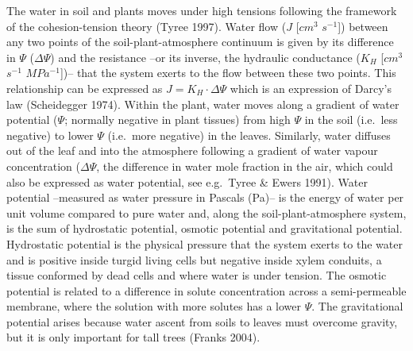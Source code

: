 \documentclass[11pt,twoside]{reedthesis}
\begin{document}
The water in soil and plants moves under high tensions following the
framework of the cohesion-tension theory (Tyree 1997). Water flow (\(J\)
{[}\(cm^3\) \(s^{-1}\){]}) between any two points of the
soil-plant-atmosphere continuum is given by its difference in \(\Psi\)
(\(\Delta\Psi\)) and the resistance --or its inverse, the hydraulic
conductance (\(K_H\) {[}\(cm^3\) \(s^{-1}\) \(MPa^{-1}\){]})-- that the
system exerts to the flow between these two points. This relationship
can be expressed as \(J = K_H·\Delta\Psi\) which is an expression of
Darcy's law (Scheidegger 1974). Within the plant, water moves along a
gradient of water potential (\(\Psi\); normally negative in plant
tissues) from high \(\Psi\) in the soil (i.e.~less negative) to lower
\(\Psi\) (i.e.~more negative) in the leaves. Similarly, water diffuses
out of the leaf and into the atmosphere following a gradient of water
vapour concentration (\(\Delta\Psi\), the difference in water mole
fraction in the air, which could also be expressed as water potential,
see e.g.~Tyree \& Ewers 1991). Water potential --measured as water
pressure in Pascals (Pa)-- is the energy of water per unit volume
compared to pure water and, along the soil-plant-atmosphere system, is
the sum of hydrostatic potential, osmotic potential and gravitational
potential. Hydrostatic potential is the physical pressure that the
system exerts to the water and is positive inside turgid living cells
but negative inside xylem conduits, a tissue conformed by dead cells and
where water is under tension. The osmotic potential is related to a
difference in solute concentration across a semi-permeable membrane,
where the solution with more solutes has a lower \(\Psi\). The
gravitational potential arises because water ascent from soils to leaves
must overcome gravity, but it is only important for tall trees (Franks
2004).\par
\end{document}
